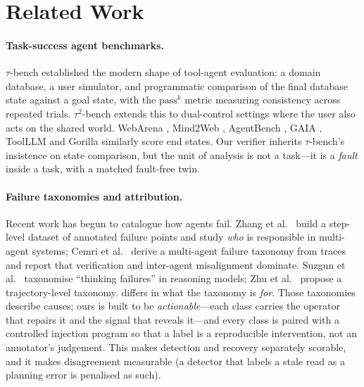 \section{Related Work}

\paragraph{Task-success agent benchmarks.} $\tau$-bench \citep{yao2024taubench} established the
modern shape of tool-agent evaluation: a domain database, a user simulator, and programmatic
comparison of the final database state against a goal state, with the $\text{pass}^k$ metric
measuring consistency across repeated trials. $\tau^2$-bench \citep{taubench2} extends this to
dual-control settings where the user also acts on the shared world. WebArena
\citep{zhou2023webarena}, Mind2Web \citep{deng2023mind2web}, AgentBench \citep{liu2023agentbench},
GAIA \citep{mialon2023gaia}, ToolLLM \citep{qin2023toolllm} and Gorilla \citep{patil2023gorilla}
similarly score end states. Our verifier inherits $\tau$-bench's insistence on state comparison,
but the unit of analysis is not a task---it is a \emph{fault} inside a task, with a matched
fault-free twin.

\paragraph{Failure taxonomies and attribution.} Recent work has begun to catalogue how agents fail.
Zhang et al.~\citep{zhang2025whowhen} build a step-level dataset of annotated failure points and study
\emph{who} is responsible in multi-agent systems; Cemri et al.~\citep{cemri2025mast} derive a multi-agent failure
taxonomy from traces and report that verification and inter-agent misalignment dominate.
Suzgun et al.~\citep{suzgun2025failuretaxonomy} taxonomise ``thinking failures'' in reasoning models;
Zhu et al.~\citep{zhu2025where} propose a trajectory-level taxonomy. \arb{} differs in what the taxonomy is
\emph{for}. Those taxonomies describe causes; ours is built to be \emph{actionable}---each class
carries the operator that repairs it and the signal that reveals it---and every class is paired with
a controlled injection program so that a label is a reproducible intervention, not an annotator's
judgement. This makes detection and recovery separately scorable, and it makes disagreement
measurable (a detector that labels a stale read as a planning error is penalised as such).

